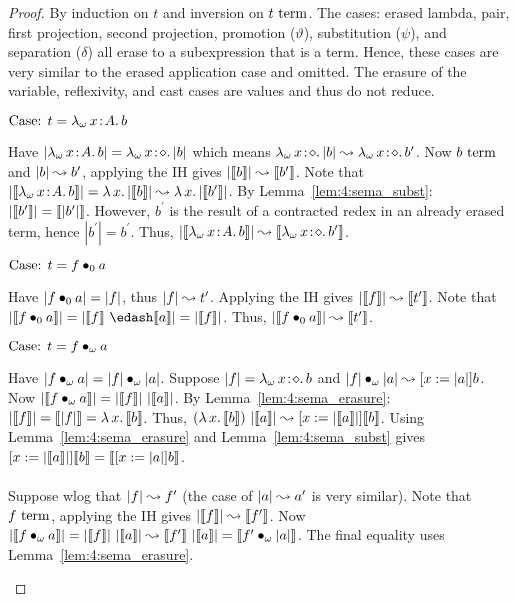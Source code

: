 \begin{proof}
    By induction on $t$ and inversion on $t~\textnormal{term}$.
    The cases: erased lambda, pair, first projection, second projection, promotion ($\vartheta$), substitution ($\psi$), and separation ($\delta$) all erase to a subexpression that is a term.
    Hence, these cases are very similar to the erased application case and omitted.
    The erasure of the variable, reflexivity, and cast cases are values and thus do not reduce.

    $\text{Case: }t = {\lambda_\omega}\, x\! : \! A.\, b$
    \begin{proofcase}
        Have $|{\lambda_\omega}\, x\! : \! A.\, b| = {\lambda_\omega}\, x\! : \! \diamond.\, |b|$ which means ${\lambda_\omega}\, x\! : \! \diamond.\, |b| \leadsto {\lambda_\omega}\, x\! : \! \diamond.\, b^\prime$.
        Now $b~\textnormal{term}$ and $|b| \leadsto b^\prime$, applying the IH gives $|\llbracket b \rrbracket| \leadsto \llbracket b^\prime \rrbracket$.
        Note that $|\llbracket {\lambda_\omega}\, x\! : \! A.\, b \rrbracket| = {\lambda}\, x.\, |\llbracket b \rrbracket| \leadsto {\lambda}\, x.\, |\llbracket b^\prime \rrbracket|$.
        By Lemma~\ref{lem:4:sema_subst}: $|\llbracket b^\prime \rrbracket| = \llbracket |b^\prime| \rrbracket$.
        However, $b^\prime$ is the result of a contracted redex in an already erased term, hence $|b^\prime| = b^\prime$.
        Thus, $|\llbracket {\lambda_\omega}\, x\! : \! A.\, b \rrbracket| \leadsto \llbracket {\lambda_\omega}\, x\! : \! \diamond.\, b^\prime \rrbracket$.
    \end{proofcase}

    $\text{Case: }t = f \bullet_{0} a$
    \begin{proofcase}
        Have $|f \bullet_{0} a| = |f|$, thus $|f| \leadsto t^\prime$.
        Applying the IH gives $|\llbracket f \rrbracket| \leadsto \llbracket t^\prime \rrbracket$.
        Note that $|\sema{\app{f}{0}{a}}| = |\sema{f}\ \edash \sema{a}| = |\sema{f}|$.
        Thus, $|\llbracket f \bullet_{0} a \rrbracket| \leadsto \llbracket t^\prime \rrbracket$.
    \end{proofcase}

    $\text{Case: }t = f \bullet_{\omega} a$
    \begin{proofcase}
        Have $|f \bullet_{\omega} a| = |f| \bullet_{\omega} |a|$.
        Suppose $|f| = {\lambda_\omega}\, x\! : \! \diamond.\, b$ and $|f| \bullet_{\omega} |a| \leadsto [x := |a|]b$.
        Now $|\sema{\app{f}{\omega}{a}}| = |\sema{f}|\ |\sema{a}|$.
        By Lemma~\ref{lem:4:sema_erasure}: $|\llbracket f \rrbracket| = \llbracket |f| \rrbracket = {\lambda}\, x.\, \llbracket b \rrbracket$.
        Thus, $({\lambda}\, x.\, \llbracket b \rrbracket)\ |\llbracket a \rrbracket| \leadsto [x := |\llbracket a \rrbracket|]\llbracket b \rrbracket$.
        Using Lemma~\ref{lem:4:sema_erasure} and Lemma~\ref{lem:4:sema_subst} gives $[x := |\llbracket a \rrbracket|]\llbracket b \rrbracket = \llbracket [x := |a|]b \rrbracket$.
        \\ \\
        Suppose wlog that $|f| \leadsto f^\prime$ (the case of $|a| \leadsto a^\prime$ is very similar).
        Note that $f~\textnormal{term}$, applying the IH gives $|\llbracket f \rrbracket| \leadsto \llbracket f^\prime \rrbracket$.
        Now $|\sema{\app{f}{\omega}{a}}| = |\sema{f}|\ |\sema{a}| \betared \sema{f^\prime}\ |\sema{a}| = \sema{\app{f^\prime}{\omega}{|a|}}$.
        The final equality uses Lemma~\ref{lem:4:sema_erasure}.
    \end{proofcase}
\end{proof}

